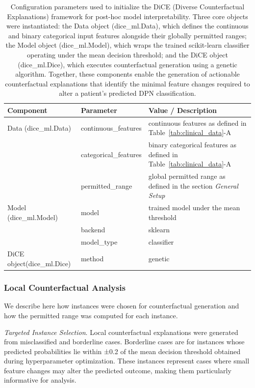 \documentclass[pdflatex,sn-vancouver-num]{sn-jnl}
\begin{document}
\begin{table}[h!]
\centering
\small
\begin{tabular}{lll}
\toprule
Component & Parameter & Value / Description \\
\midrule
Data (dice\_ml.Data) & continuous\_features & continuous features as defined in Table~\ref{tab:clinical_data}-A \\
& categorical\_features & binary categorical features as defined in Table~\ref{tab:clinical_data}-A \\
& permitted\_range & global permitted range as defined in the section \textit{General Setup}\\
\midrule
Model (dice\_ml.Model) & model & trained model under the mean threshold \\
& backend & sklearn \\
& model\_type & classifier \\
\midrule
DiCE object(dice\_ml.Dice)  & method & genetic \\
\bottomrule
\end{tabular}
\caption{Configuration parameters used to initialize the DiCE (Diverse Counterfactual Explanations) framework for post-hoc model interpretability. Three core objects were instantiated: the Data object (dice\_ml.Data), which defines the continuous and binary categorical input features alongside their globally permitted ranges; the Model object (dice\_ml.Model), which wraps the trained scikit-learn classifier operating under the mean decision threshold; and the DiCE object (dice\_ml.Dice), which executes counterfactual generation using a genetic algorithm. Together, these components enable the generation of actionable counterfactual explanations that identify the minimal feature changes required to alter a patient's predicted DPN classification.}
\label{tab:dice_setup}
\end{table}

\subsubsection{Local Counterfactual Analysis}
We describe here how instances were chosen for counterfactual generation and how the permitted range was computed for each instance.

\textit{Targeted Instance Selection}.
Local counterfactual explanations were generated from misclassified and borderline cases. Borderline cases are for instances whose predicted probabilities lie within ±0.2 of the mean decision threshold obtained during hyperparameter optimization. These instances represent cases where small feature changes may alter the predicted outcome, making them particularly informative for analysis.
\end{document}
